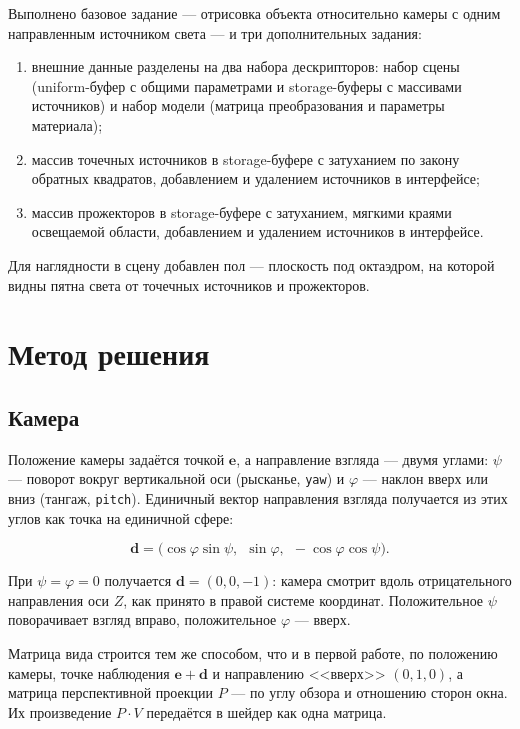 \documentclass[14pt,a4paper]{extarticle}
\begin{document}
Выполнено базовое задание — отрисовка объекта относительно камеры с одним
направленным источником света — и три дополнительных задания:

\begin{enumerate}[nosep, leftmargin=*]
	\item внешние данные разделены на два набора дескрипторов: набор сцены
	(uniform-буфер с общими параметрами и storage-буферы с массивами
	источников) и набор модели (матрица преобразования и параметры материала);
	\item массив точечных источников в storage-буфере с затуханием по закону
	обратных квадратов, добавлением и удалением источников в интерфейсе;
	\item массив прожекторов в storage-буфере с затуханием, мягкими краями
	освещаемой области, добавлением и удалением источников в интерфейсе.
\end{enumerate}

Для наглядности в сцену добавлен пол — плоскость под октаэдром, на которой
видны пятна света от точечных источников и прожекторов.

\section{Метод решения}

\subsection{Камера}

Положение камеры задаётся точкой $\mathbf{e}$, а направление взгляда — двумя
углами: $\psi$ — поворот вокруг вертикальной оси (рысканье, \texttt{yaw}) и
$\varphi$ — наклон вверх или вниз (тангаж, \texttt{pitch}). Единичный вектор
направления взгляда получается из этих углов как точка на единичной сфере:

\begin{equation}
	\mathbf{d} = \bigl(\cos\varphi \sin\psi,\ \ \sin\varphi,\ \ -\cos\varphi \cos\psi\bigr).
	\label{eq:forward}
\end{equation}

При $\psi = \varphi = 0$ получается $\mathbf{d} = (0, 0, -1)$: камера смотрит
вдоль отрицательного направления оси $Z$, как принято в правой системе
координат. Положительное $\psi$ поворачивает взгляд вправо, положительное
$\varphi$ — вверх.

Матрица вида строится тем же способом, что и в первой работе, по положению
камеры, точке наблюдения $\mathbf{e} + \mathbf{d}$ и направлению <<вверх>>
$(0, 1, 0)$, а матрица перспективной проекции $P$ — по углу обзора и отношению
сторон окна. Их произведение $P \cdot V$ передаётся в шейдер как одна матрица.
\end{document}
